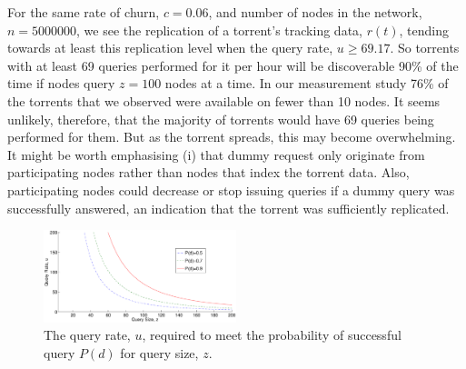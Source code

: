     For the same rate of churn, $c=0.06$, and number of nodes in the network, $n=5000000$, we see the replication of a torrent's tracking data, $r(t)$, tending towards at least this replication level when the query rate, $u\ge69.17$. So torrents with at least 69 queries performed for it per hour will be discoverable 90\% of the time if nodes query $z=100$ nodes at a time. In our measurement study 76\% of the torrents that we observed were available on fewer than 10 nodes. It seems unlikely, therefore, that the majority of torrents would have 69 queries being performed for them. But as the torrent spreads, this may become overwhelming. It might be worth emphasising (i) that dummy request only originate from participating nodes rather than nodes that index the torrent data. Also, participating nodes could decrease or stop issuing queries if a dummy query was successfully answered, an indication that the torrent was sufficiently replicated.

    \begin{figure}[t]
        \centering
        \includegraphics[width=0.5\textwidth]{Images/QueryRatevsSize.eps}
        \caption{The query rate, $u$, required to meet the probability of successful query $P(d)$ for query size, $z$.}
        \label{fig:query_rate_vs_query_size}
    \end{figure}

